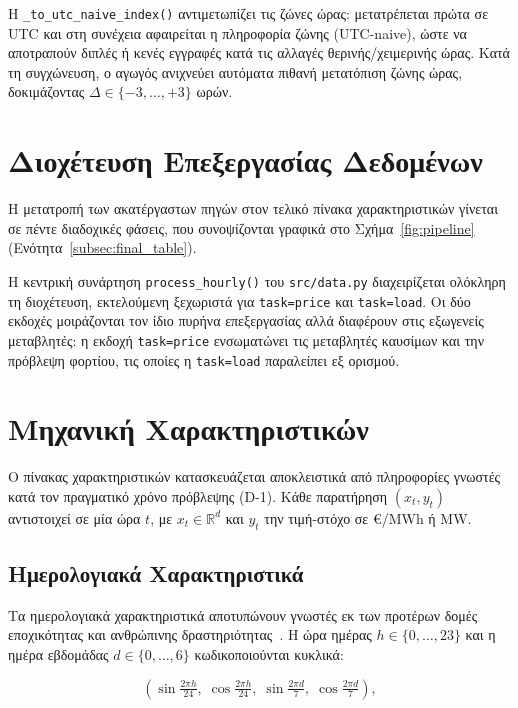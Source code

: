 Η \texttt{\_to\_utc\_naive\_index()} αντιμετωπίζει τις ζώνες ώρας: μετατρέπεται πρώτα σε
UTC και στη συνέχεια αφαιρείται η πληροφορία ζώνης (UTC-naive), ώστε να αποτραπούν
διπλές ή κενές εγγραφές κατά τις αλλαγές θερινής/χειμερινής ώρας. Κατά τη συγχώνευση,
ο αγωγός ανιχνεύει αυτόματα πιθανή μετατόπιση ζώνης ώρας, δοκιμάζοντας
$\Delta \in \{-3,\ldots,+3\}$ ωρών.


\section{Διοχέτευση Επεξεργασίας Δεδομένων}
\label{sec:pipeline}

Η μετατροπή των ακατέργαστων πηγών στον τελικό πίνακα χαρακτηριστικών γίνεται σε πέντε
διαδοχικές φάσεις, που συνοψίζονται γραφικά στο Σχήμα~\ref{fig:pipeline} (Ενότητα~\ref{subsec:final_table}).

Η κεντρική συνάρτηση \texttt{process\_hourly()} του \texttt{src/data.py} διαχειρίζεται
ολόκληρη τη διοχέτευση, εκτελούμενη ξεχωριστά για \texttt{task=price} και \texttt{task=load}.
Οι δύο εκδοχές μοιράζονται τον ίδιο πυρήνα επεξεργασίας αλλά διαφέρουν στις εξωγενείς
μεταβλητές: η εκδοχή \texttt{task=price} ενσωματώνει τις μεταβλητές καυσίμων και την
πρόβλεψη φορτίου, τις οποίες η \texttt{task=load} παραλείπει εξ ορισμού.


\section{Μηχανική Χαρακτηριστικών}
\label{sec:feature_engineering}

Ο πίνακας χαρακτηριστικών κατασκευάζεται αποκλειστικά από πληροφορίες γνωστές κατά τον
πραγματικό χρόνο πρόβλεψης (D-1). Κάθε παρατήρηση $(x_t, y_t)$ αντιστοιχεί σε μία ώρα
$t$, με $x_t \in \mathbb{R}^d$ και $y_t$ την τιμή-στόχο σε €/MWh ή MW.


\subsection{Ημερολογιακά Χαρακτηριστικά}

Τα ημερολογιακά χαρακτηριστικά αποτυπώνουν γνωστές εκ των προτέρων δομές εποχικότητας
και ανθρώπινης δραστηριότητας~\cite{uniejewski2019}. Η ώρα ημέρας $h \in \{0,\ldots,23\}$
και η ημέρα εβδομάδας $d \in \{0,\ldots,6\}$ κωδικοποιούνται κυκλικά:

\begin{equation}
  \left(\sin\tfrac{2\pi h}{24},\; \cos\tfrac{2\pi h}{24},\;
        \sin\tfrac{2\pi d}{7},\; \cos\tfrac{2\pi d}{7}\right),
  \label{eq:cyclic}
\end{equation}

